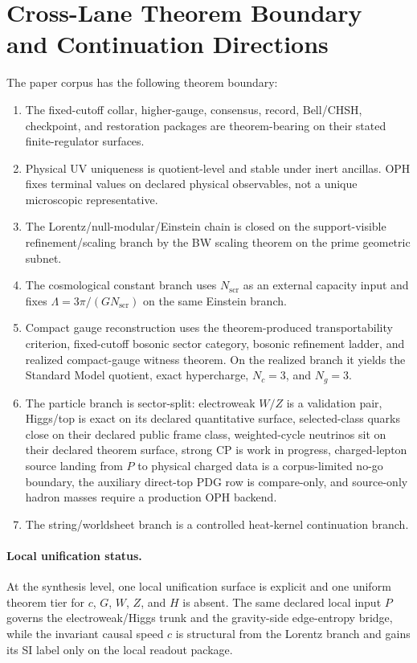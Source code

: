 \section{Cross-Lane Theorem Boundary and Continuation Directions}

The paper corpus has the following theorem boundary:

\begin{enumerate}[leftmargin=2em]
\item The fixed-cutoff collar, higher-gauge, consensus, record, Bell/CHSH, checkpoint, and
restoration packages are theorem-bearing on their stated finite-regulator surfaces.
\item Physical UV uniqueness is quotient-level and stable under inert ancillas. OPH fixes terminal
values on declared physical observables, not a unique microscopic representative.
\item The Lorentz/null-modular/Einstein chain is closed on the support-visible refinement/scaling
branch by the BW scaling theorem on the prime geometric subnet.
\item The cosmological constant branch uses \(N_{\mathrm{scr}}\) as an external capacity input and
fixes \(\Lambda=3\pi/(G N_{\mathrm{scr}})\) on the same Einstein branch.
\item Compact gauge reconstruction uses the theorem-produced transportability criterion, fixed-cutoff bosonic sector category, bosonic refinement ladder, and realized compact-gauge witness theorem. On the realized branch it yields the Standard Model quotient, exact hypercharge, \(N_c=3\), and \(N_g=3\).
\item The particle branch is sector-split: electroweak \(W/Z\) is a validation pair, Higgs/top is exact on its declared quantitative surface, selected-class quarks close on their declared public frame class, weighted-cycle neutrinos sit on their declared theorem surface, strong CP is work in progress, charged-lepton source landing from \(P\) to physical charged data is a corpus-limited no-go boundary, the auxiliary direct-top PDG row is compare-only, and source-only hadron masses require a production OPH backend.
\item The string/worldsheet branch is a controlled heat-kernel continuation branch.
\end{enumerate}

\paragraph{Local unification status.}
At the synthesis level, one local unification surface is explicit and one uniform theorem tier for
\(c\), \(G\), \(W\), \(Z\), and \(H\) is absent. The same declared local input \(P\) governs the
electroweak/Higgs trunk and the gravity-side edge-entropy bridge, while the invariant causal speed
\(c\) is structural from the Lorentz branch and gains its SI label only on the local readout
package.

